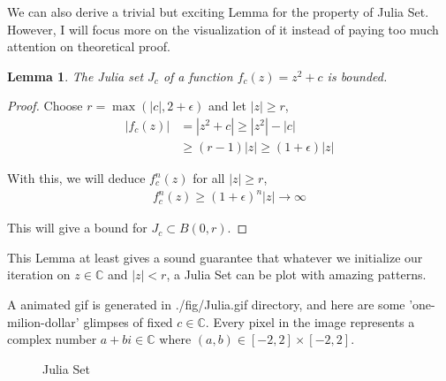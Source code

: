 \documentclass[11pt]{article}
\newtheorem{lemma}[theorem]{Lemma}
\begin{document}
We can also derive a trivial but exciting Lemma for the property of Julia Set. However, I will focus more on the visualization of it instead of paying too much attention on theoretical proof.
\begin{lemma}
	The Julia set $J_c$ of a function $f_c(z)=z^2+c$ is bounded.
\end{lemma} 
\begin{proof}
	Choose $r = \max(|c|, 2+\epsilon)$ and let $|z|\ge r$,
	\begin{align*}
		|f_c(z)|&=|z^2+c|\ge |z^2|-|c| \\&\ge (r-1)|z| \ge (1+\epsilon)|z|
	\end{align*}

	With this, we will deduce $f_c^n(z)$ for all $|z|\ge r$,
	\begin{align*}
		f_c^n(z)\ge (1+\epsilon)^n|z|\rightarrow\infty
	\end{align*}

	This will give a bound for $J_c\subset B(0,r)$.
\end{proof}

This Lemma at least gives a sound guarantee that whatever we initialize our iteration on $z\in \mathbb{C}$ and $|z|<r$, a Julia Set can be plot with amazing patterns.

A animated gif is generated in ./fig/Julia.gif directory, and here are some 'one-milion-dollar' glimpses of fixed $c\in \mathbb{C}$. Every pixel in the image represents a complex number $a+bi\in\mathbb{C}$ where $(a,b)\in[-2,2]\times[-2,2]$.
\begin{figure}[H]
	\centering
\caption{Julia Set}
\end{figure}
\end{document}
